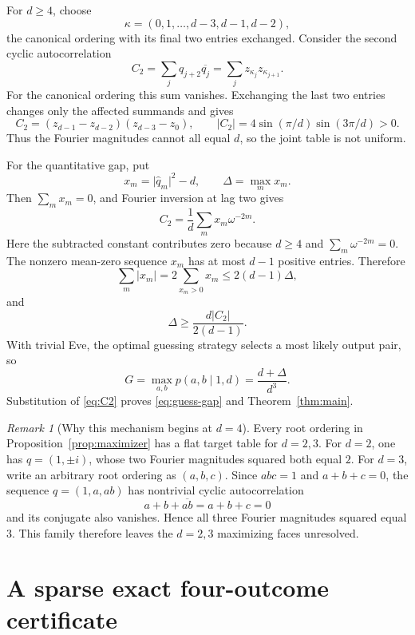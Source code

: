 \documentclass[11pt]{article}
\theoremstyle{remark}
\newtheorem{remark}[theorem]{Remark}
\begin{document}
For \(d\geq4\), choose
\begin{equation}
  \kappa=(0,1,\ldots,d-3,d-1,d-2),
  \label{eq:bad-order}
\end{equation}
the canonical ordering with its final two entries exchanged.  Consider the
second cyclic autocorrelation
\[
  C_2=\sum_jq_{j+2}\overline{q_j}
  =\sum_jz_{\kappa_j}z_{\kappa_{j+1}}.
\]
For the canonical ordering this sum vanishes.  Exchanging the last two
entries changes only the affected summands and gives
\begin{equation}
  C_2=(z_{d-1}-z_{d-2})(z_{d-3}-z_0),
  \qquad
  \lvert C_2\rvert
  =4\sin(\pi/d)\sin(3\pi/d)>0.
  \label{eq:C2}
\end{equation}
Thus the Fourier magnitudes cannot all equal \(d\), so the joint table is
not uniform.

For the quantitative gap, put
\[
  x_m=\lvert\widehat q_m\rvert^2-d,\qquad
  \Delta=\max_mx_m.
\]
Then \(\sum_mx_m=0\), and Fourier inversion at lag two gives
\[
  C_2=\frac1d\sum_mx_m\omega^{-2m}.
\]
Here the subtracted constant contributes zero because \(d\geq4\) and
\(\sum_m\omega^{-2m}=0\).
The nonzero mean-zero sequence \(x_m\) has at most \(d-1\) positive entries.
Therefore
\[
  \sum_m\lvert x_m\rvert
  =2\sum_{x_m>0}x_m
  \leq2(d-1)\Delta,
\]
and
\[
  \Delta\geq\frac{d\lvert C_2\rvert}{2(d-1)}.
\]
With trivial Eve, the optimal guessing strategy selects a most likely output
pair, so
\[
  G=\max_{a,b}p(a,b\mid1,d)=\frac{d+\Delta}{d^3}.
\]
Substitution of \eqref{eq:C2} proves \eqref{eq:guess-gap} and
Theorem~\ref{thm:main}.

\begin{remark}[Why this mechanism begins at \(d=4\)]
Every root ordering in Proposition~\ref{prop:maximizer} has a flat target
table for \(d=2,3\).  For \(d=2\), one has
\(q=(1,\pm i)\), whose two Fourier magnitudes squared both equal \(2\).
For \(d=3\), write an arbitrary root ordering as \((a,b,c)\).  Since
\(abc=1\) and \(a+b+c=0\), the sequence \(q=(1,a,ab)\) has nontrivial
cyclic autocorrelation
\[
  a+b+\overline{ab}=a+b+c=0
\]
and its conjugate also vanishes.  Hence all three Fourier magnitudes squared
equal \(3\).  This family therefore leaves the \(d=2,3\) maximizing faces
unresolved.
\end{remark}

\section{A sparse exact four-outcome certificate}\label{sec:d4}
\end{document}
